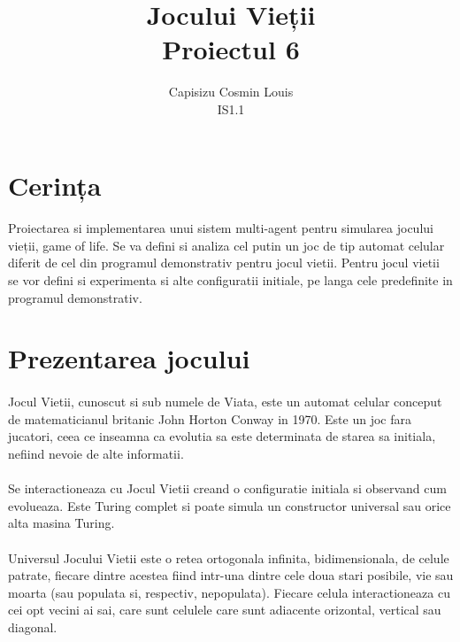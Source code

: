 \documentclass[11pt ,A4]{article}
\title{Jocului Vieții\\Proiectul 6}
\author{Capisizu Cosmin Louis\\IS1.1} %
\begin{document}
    \maketitle %
    \pagebreak

    \section{Cerința} %
        \paragraph{}
            Proiectarea si implementarea unui sistem multi-agent pentru simularea jocului vieții, game of life. Se va defini si analiza cel putin un joc de tip automat celular diferit de cel din programul demonstrativ pentru jocul vietii. Pentru jocul vietii se vor defini si experimenta si alte configuratii initiale, pe langa cele predefinite in programul demonstrativ.

    \section{Prezentarea jocului}

        \paragraph{}Jocul Vietii, cunoscut si sub numele de Viata, este un automat celular conceput de matematicianul britanic John Horton Conway in 1970. Este un joc fara jucatori, ceea ce inseamna ca evolutia sa este determinata de starea sa initiala, nefiind nevoie de alte informatii.

        \paragraph{} Se interactioneaza cu Jocul Vietii creand o configuratie initiala si observand cum evolueaza. Este Turing complet si poate simula un constructor universal sau orice alta masina Turing.

        \paragraph{} Universul Jocului Vietii este o retea ortogonala infinita, bidimensionala, de celule patrate, fiecare dintre acestea fiind intr-una dintre cele doua stari posibile, vie sau moarta (sau populata si, respectiv, nepopulata). Fiecare celula interactioneaza cu cei opt vecini ai sai, care sunt celulele care sunt adiacente orizontal, vertical sau diagonal.
\end{document}

